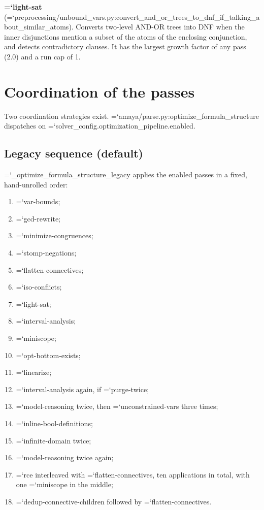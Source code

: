 \documentclass[10pt,a4paper]{article}
\newcommand{\code}[1]{{\small\ttfamily\hyphenchar\font=`\-\relax #1}}
\begin{document}
\textbf{\code{light-sat}}
(\code{preprocessing/unbound\_\allowbreak vars.py:\allowbreak convert\_\allowbreak and\_\allowbreak or\_\allowbreak trees\_\allowbreak to\_\allowbreak dnf\_\allowbreak if\_\allowbreak talking\_\allowbreak about\_\allowbreak similar\_\allowbreak atoms}).
Converts two-level AND-OR trees into DNF when the inner disjunctions mention a subset of the atoms of
the enclosing conjunction, and detects contradictory clauses.  It has the largest growth factor of any
pass (2.0) and a run cap of 1.

\section{Coordination of the passes}
\label{sec:coordination}

Two coordination strategies exist.  \code{amaya/parse.py:\allowbreak optimize\_\allowbreak formula\_\allowbreak structure} dispatches on
\code{solver\_\allowbreak config.\allowbreak optimization\_\allowbreak pipeline.\allowbreak enabled}.

\subsection{Legacy sequence (default)}

\code{\_\allowbreak optimize\_\allowbreak formula\_\allowbreak structure\_\allowbreak legacy} applies the enabled passes in a fixed, hand-unrolled
order:

\begin{enumerate}
  \item \code{var-bounds};
  \item \code{gcd-rewrite};
  \item \code{minimize-congruences};
  \item \code{stomp-negations};
  \item \code{flatten-connectives};
  \item \code{iso-conflicts};
  \item \code{light-sat};
  \item \code{interval-analysis};
  \item \code{miniscope};
  \item \code{opt-bottom-exists};
  \item \code{linearize};
  \item \code{interval-analysis} again, if \code{purge-twice};
  \item \code{model-reasoning} twice, then \code{unconstrained-vars} three times;
  \item \code{inline-bool-definitions};
  \item \code{infinite-domain} twice;
  \item \code{model-reasoning} twice again;
  \item \code{rce} interleaved with \code{flatten-connectives}, ten applications in total, with one
        \code{miniscope} in the middle;
  \item \code{dedup-connective-children} followed by \code{flatten-connectives}.
\end{enumerate}
\end{document}
